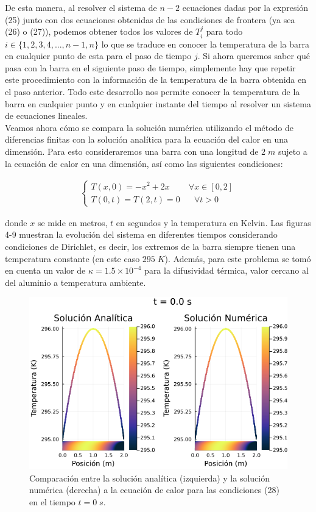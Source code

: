\documentclass[12pt]{article}
\begin{document}
De esta manera, al resolver el sistema de $n-2$ ecuaciones dadas por la expresión (25) junto con dos ecuaciones obtenidas de las condiciones de frontera (ya sea (26) o (27)), podemos obtener todos los valores de $T_i^j$ para todo $i \in \{1,2,3,4,...,n-1,n\}$ lo que se traduce en conocer la temperatura de la barra en cualquier punto de esta para el paso de tiempo $j$. Si ahora queremos saber qué pasa con la barra en el siguiente paso de tiempo, simplemente hay que repetir este procedimiento con la información de la temperatura de la barra obtenida en el paso anterior. Todo este desarrollo nos permite conocer la temperatura de la barra en cualquier punto y en cualquier instante del tiempo al resolver un sistema de ecuaciones lineales. \\

Veamos ahora cómo se compara la solución numérica utilizando el método de diferencias finitas con la solución analítica para la ecuación del calor en una dimensión. Para esto consideraremos una barra con una longitud de $2 \; m$ sujeto a la ecuación de calor en una dimensión, así como las siguientes condiciones:

\begin{align}
    \begin{cases}
        T(x,0) = -x^2 + 2x \;\;\;\;\;\;\;\; \forall x \in [0,2]\\
        T(0,t) = T(2,t) = 0 \;\;\;\;\;\; \forall t>0
    \end{cases}
\end{align}

donde $x$ se mide en metros, $t$ en segundos y la temperatura en Kelvin. Las figuras 4-9 muestran la evolución del sistema en diferentes tiempos considerando condiciones de Dirichlet, es decir, los extremos de la barra siempre tienen una temperatura constante (en este caso $295 \; K$). Además, para este problema se tomó en cuenta un valor de $\kappa = 1.5 \times 10^{-4}$ para la difusividad térmica, valor cercano al del aluminio a temperatura ambiente. \\

\begin{figure}[H]
\begin{center}
    \includegraphics[width=0.79\linewidth]{Ejemplo_01_t_0.png}
    \caption{Comparación entre la solución analítica (izquierda) y la solución numérica (derecha) a la ecuación de calor para las condiciones (28) en el tiempo $t=0 \; s$.}
\end{center}
\end{figure}
\end{document}
